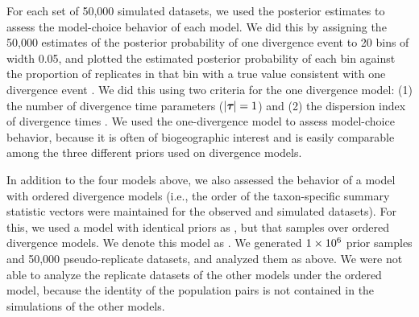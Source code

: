 For each set of 50,000 simulated datasets, we used the posterior estimates
to assess the model-choice behavior of each model.
We did this by assigning the 50,000 estimates of the posterior probability
of one divergence event to 20 bins of width 0.05, and plotted
the estimated posterior probability of each bin against the proportion of
replicates in that bin with a true value consistent with one divergence
event \citep{Huelsenbeck2004,Oaks2012}.
We did this using two criteria for the one divergence model:
(1) the number of divergence time parameters ($\lvert \boldsymbol{\tau_{}} \rvert = 1$) and
(2) the dispersion index of divergence times \citep[$\divTimeDispersion <
0.01$][]{Hickerson2006,Huang2011}.
We used the one-divergence model to assess model-choice behavior, because
it is often of biogeographic interest and is easily comparable among
the three different priors used on divergence models.

In addition to the four models above, we also assessed the behavior of a model
with ordered divergence models (i.e., the order of the taxon-specific summary
statistic vectors were maintained for the observed and simulated datasets).
For this, we used a model with identical priors as \modelDPP, but that samples
over ordered divergence models.
We denote this model as \modelDPPOrdered.
We generated $1\times 10^{6}$ prior samples and 50,000 pseudo-replicate datasets, and
analyzed them as above.
We were not able to analyze the replicate datasets of the other models under
the ordered model, because the identity of the population pairs is not
contained in the simulations of the other models.

